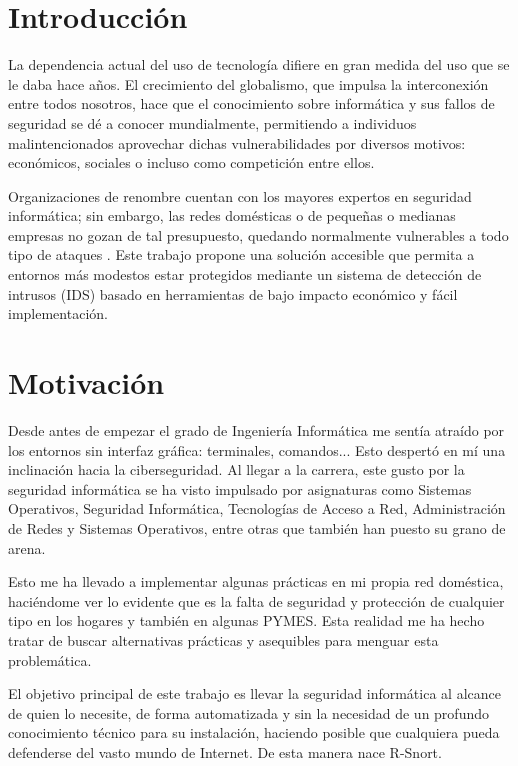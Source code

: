 \documentclass[11pt,a4paper,twoside]{report}
\begin{document}

\chapter{Introducción}
La dependencia actual del uso de tecnología difiere en gran medida del uso que se le daba hace años. El crecimiento del globalismo, que impulsa la interconexión entre todos nosotros, hace que el conocimiento sobre informática y sus fallos de seguridad se dé a conocer mundialmente, permitiendo a individuos malintencionados aprovechar dichas vulnerabilidades por diversos motivos: económicos, sociales o incluso como competición entre ellos.\newline

Organizaciones de renombre cuentan con los mayores expertos en seguridad informática; sin embargo, las redes domésticas o de pequeñas o medianas empresas no gozan de tal presupuesto, quedando normalmente vulnerables a todo tipo de ataques \cite{enisa_smes}. Este trabajo propone una solución accesible que permita a entornos más modestos estar protegidos mediante un sistema de detección de intrusos (IDS) basado en herramientas de bajo impacto económico y fácil implementación.

\chapter{Motivación}
Desde antes de empezar el grado de Ingeniería Informática me sentía atraído por los entornos sin interfaz gráfica: terminales, comandos... Esto despertó en mí una inclinación hacia la ciberseguridad. Al llegar a la carrera, este gusto por la seguridad informática se ha visto impulsado por asignaturas como Sistemas Operativos, Seguridad Informática, Tecnologías de Acceso a Red, Administración de Redes y Sistemas Operativos, entre otras que también han puesto su grano de arena.\newline

Esto me ha llevado a implementar algunas prácticas en mi propia red doméstica, haciéndome ver lo evidente que es la falta de seguridad y protección de cualquier tipo en los hogares y también en algunas PYMES. Esta realidad me ha hecho tratar de buscar alternativas prácticas y asequibles para menguar esta problemática.\newline

El objetivo principal de este trabajo es llevar la seguridad informática al alcance de quien lo necesite, de forma automatizada y sin la necesidad de un profundo conocimiento técnico para su instalación, haciendo posible que cualquiera pueda defenderse del vasto mundo de Internet. De esta manera nace R-Snort.\newline
\end{document}
